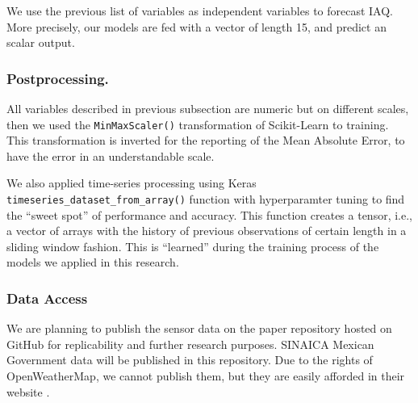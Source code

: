 \documentclass{llncs}
\begin{document}
We use the previous list of variables as independent variables to forecast IAQ. More precisely, our models are fed with a vector of length 15, and predict an scalar output.




\hypertarget{postprocessing.}{%
\subsubsection{Postprocessing.}\label{postprocessing.}}

All variables described in previous subsection are numeric but on
different scales, then we used the \texttt{MinMaxScaler()}
transformation of Scikit-Learn to training. This transformation is
inverted for the reporting of the Mean Absolute Error, to have the error
in an understandable scale.

We also applied time-series processing using Keras
\texttt{timeseries\_dataset\_from\_array()} function with hyperparamter
tuning to find the ``sweet spot'' of performance and accuracy. This
function creates a tensor, i.e., a vector of arrays with the history of
previous observations of certain length in a sliding window fashion.
This is ``learned'' during the training process of the models we applied
in this research.

\hypertarget{data-access}{%
\subsubsection{Data Access}\label{data-access}}

We are planning to publish the sensor data on the paper repository hosted
on GitHub for replicability and further research purposes. SINAICA
Mexican Government data will be published in this repository. Due to the
rights of OpenWeatherMap, we cannot publish them, but they are easily
afforded in their website \cite{openweather}.
\end{document}
